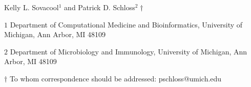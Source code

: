 
\begin{center}
\vspace{25mm}

Kelly L. Sovacool${^1}$ and Patrick D. Schloss${^2\dagger}$

$1$ Department of Computational Medicine and Bioinformatics,
University of Michigan, Ann Arbor, MI 48109

$2$ Department of Microbiology and Immunology,
University of Michigan, Ann Arbor, MI 48109

\vspace{30mm}

$\dagger$ To whom correspondence should be addressed: pschloss@umich.edu

\end{center}


\newpage
\linenumbers
